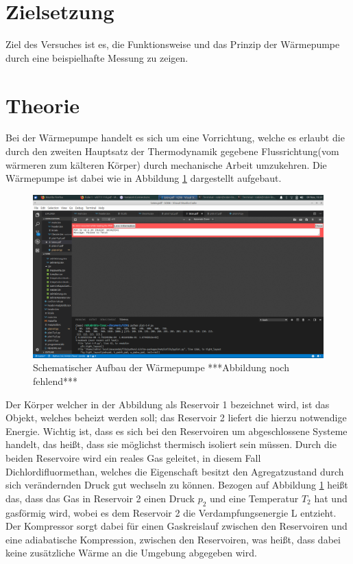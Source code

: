 \section{Zielsetzung}
  Ziel des Versuches ist es, die Funktionsweise und das Prinzip der Wärmepumpe durch eine beispielhafte Messung zu zeigen.

\section{Theorie}
  \label{sec:Theorie}
  Bei der Wärmepumpe handelt es sich um eine Vorrichtung, welche es erlaubt die durch den zweiten Hauptsatz der Thermodynamik gegebene Flussrichtung(vom wärmeren zum kälteren Körper) durch
  mechanische Arbeit umzukehren. Die Wärmepumpe ist dabei wie in Abbildung \ref{fig:skizze} dargestellt aufgebaut.
  \begin{figure}
    \centering
    \includegraphics{content/skizze.png}
    \caption{Schematischer Aufbau der Wärmepumpe ***Abbildung noch fehlend*** \cite[193]{206}}
    \label{fig:skizze}
  \end{figure}
  Der Körper welcher in der Abbildung als Reservoir 1 bezeichnet wird, ist das Objekt, welches beheizt werden soll; das Reservoir 2 liefert die hierzu notwendige Energie.
  Wichtig ist, dass es sich bei den Reservoiren um abgeschlossene Systeme handelt, das heißt, dass sie möglichst thermisch isoliert sein müssen.
  Durch die beiden Reservoire wird ein reales Gas geleitet, in diesem Fall Dichlordifluormethan, welches die Eigenschaft besitzt den Agregatzustand durch sich verändernden Druck gut wechseln zu können.
  Bezogen auf Abbildung \ref{fig:skizze} heißt das, dass das Gas in Reservoir 2 einen Druck $p_2$ und eine Temperatur $T_2$ hat und gasförmig wird, wobei es dem Reservoir 2 die Verdampfungsenergie L entzieht. 
  Der Kompressor sorgt dabei für einen Gaskreislauf zwischen den Reservoiren und eine adiabatische Kompression, zwischen den Reservoiren, was heißt, dass dabei keine zusätzliche Wärme an die Umgebung abgegeben wird.
